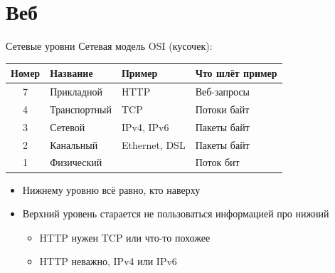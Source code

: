 \section{Веб}
\begin{frame}[t]{Сетевые уровни}
	Сетевая модель OSI (кусочек):
	
	\begin{center}
		\begin{tabular}{clll}
		\hline
		Номер & Название &  Пример & Что шлёт пример \\\hline
		7 & Прикладной & HTTP & Веб-запросы \\
		4 & Транспортный & TCP & Потоки байт \\\hline
		3 & Сетевой & IPv4, IPv6 & Пакеты байт \\
		2 & Канальный & Ethernet, DSL & Пакеты байт \\
		1 & Физический & & Поток бит \\\hline
		\end{tabular}
	\end{center}
	
	\begin{itemize}
		\item Нижнему уровню всё равно, кто наверху
		\item Верхний уровень старается не пользоваться информацией про нижний
			\begin{itemize}
			\item HTTP нужен TCP или что-то похожее
			\item HTTP неважно, IPv4 или IPv6
			\end{itemize}
	\end{itemize}
\end{frame}


